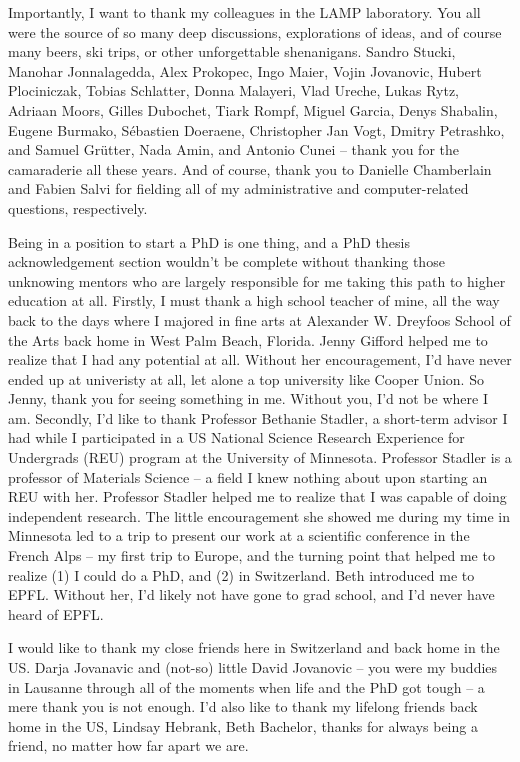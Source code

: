 \vspace{0.5cm}
Importantly, I want to thank my colleagues in the LAMP laboratory. You
all were the source of so many deep discussions, explorations of ideas, and of
course many beers, ski trips, or other unforgettable shenanigans. Sandro Stucki,
Manohar Jonnalagedda, Alex Prokopec, Ingo Maier, Vojin Jovanovic, Hubert
Plociniczak, Tobias Schlatter, Donna Malayeri, Vlad Ureche, Lukas Rytz, Adriaan
Moors, Gilles Dubochet, Tiark Rompf, Miguel Garcia, Denys Shabalin, Eugene
Burmako, S\'{e}bastien Doeraene, Christopher Jan Vogt, Dmitry Petrashko, and
Samuel Gr\"{u}tter, Nada Amin, and Antonio Cunei -- thank you for the
camaraderie all these years. And of course, thank you to Danielle Chamberlain
and Fabien Salvi for fielding all of my administrative and computer-related
questions, respectively.

\vspace{0.5cm}
Being in a position to start a PhD is one thing, and a PhD thesis
acknowledgement section wouldn't be complete without thanking those unknowing
mentors who are largely responsible for me taking this path to higher education
at all. Firstly, I must thank a high school teacher of mine, all the way back to
the days where I majored in fine arts at Alexander W. Dreyfoos School of the
Arts back home in West Palm Beach, Florida. Jenny Gifford helped me to realize
that I had any potential at all. Without her encouragement, I'd have never ended
up at univeristy at all, let alone a top university like Cooper Union. So Jenny,
thank you for seeing something in me. Without you, I'd not be where I am.
Secondly, I'd like to thank Professor Bethanie Stadler, a short-term advisor I
had while I participated in a US National Science Research Experience for
Undergrads (REU) program at the University of Minnesota. Professor Stadler is a
professor of Materials Science -- a field I knew nothing about upon starting an
REU with her. Professor Stadler helped me to realize that I was capable of doing
independent research. The little encouragement she showed me during my time in
Minnesota led to a trip to present our work at a scientific conference in the
French Alps -- my first trip to Europe, and the turning point that helped me to
realize (1) I could do a PhD, and (2) in Switzerland. Beth introduced me to
EPFL. Without her, I'd likely not have gone to grad school, and I'd never have
heard of EPFL.

\vspace{0.5cm} I would like to thank my close friends here in Switzerland and
back home in the US. Darja Jovanavic and (not-so) little David Jovanovic -- you
were my buddies in Lausanne through all of the moments when life and the PhD got
tough -- a mere thank you is not enough. I'd also like to thank my lifelong
friends back home in the US, Lindsay Hebrank, Beth Bachelor, thanks for always
being a friend, no matter how far apart we are.

